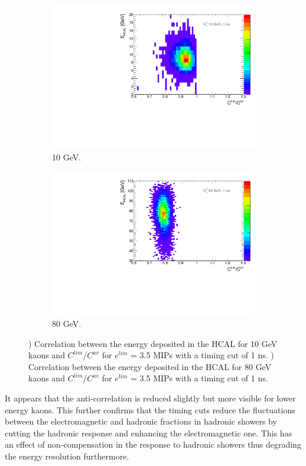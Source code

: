 \begin{figure}[htbp!]
  \centering
  \begin{subfigure}[t]{0.45\textwidth}
    \centering
    \includegraphics[width=1\linewidth]{../Thesis_Plots/ILD/AdditionalPlots/Plots/EhcalCLimCav_1ns_10GeV.pdf}
    \caption{10 GeV.} \label{fig:EhcalCLimCav10_1ns}
  \end{subfigure}
  \hfill
  \begin{subfigure}[t]{0.45\textwidth}
    \centering
    \includegraphics[width=1\linewidth]{../Thesis_Plots/ILD/AdditionalPlots/Plots/EhcalCLimCav_1ns_80GeV.pdf}
    \caption{80 GeV.} \label{fig:EhcalCLimCav80_1ns}
  \end{subfigure}
  \caption{) Correlation between the energy deposited in the HCAL for 10 GeV kaons and $C^{lim}$/$C^{av}$ for $e^{lim}$ = 3.5 MIPs with a timing cut of 1 ns. ) Correlation between the energy deposited in the HCAL for 80 GeV kaons and $C^{lim}$/$C^{av}$ for $e^{lim}$ = 3.5 MIPs with a timing cut of 1 ns.}
\end{figure}

It appears that the anti-correlation is reduced slightly but more visible for lower energy kaons. This further confirms that the timing cuts reduce the fluctuations between the electromagnetic and hadronic fractions in hadronic showers by cutting the hadronic response and enhancing the electromagnetic one. This has an effect of non-compensation in the response to hadronic showers thus degrading the energy resolution furthermore.

